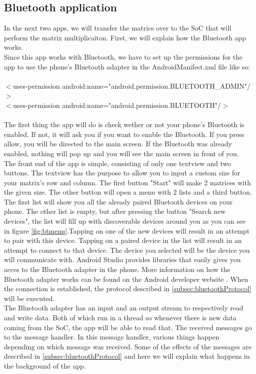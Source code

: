\documentclass[a4paper, 11pt]{report}
\begin{document}
	\subsection{Bluetooth application}
In the next two apps, we will transfer the matrics over to the SoC that will perform the matrix multiplicaiton. First, we will explain how the Bluetooth app works.\\
Since this app works with Bluetooth, we have to set up the permissions for the app to use the phone's Bluetooth adapter in the AndroidManifest.xml file like so:\\\\
\indent	$<$uses-permission android:name="android.permission.BLUETOOTH\_ADMIN"/$>$\\
\indent $<$uses-permission android:name="android.permission.BLUETOOTH"/$>$
\\\\
The first thing the app will do is check wether or not your phone's Bluetooth is enabled. If not, it will ask you if you want to enable the Bluetooth. If you press allow, you will be directed to the main screen. If the Bluetooth was already enabled, nothing will pop up and you will see the main screen in front of you. The front end of the app is simple, consisting of only one textview and two buttons. The textview has the purpose to allow you to input a custom size for your matrix's row and column. The first button "Start" will make 2 matrices with the given size. The other button will open a menu with 2 lists and a third button. The first list will show you all the already paired Bluetooth devices on your phone. The other list is empty, but after pressing the button "Search new devices", the list will fill up with discoverable devices around you as you can see in figure \ref{fig:btmenu}.Tapping on one of the new devices will result in an attempt to pair with this device. Tapping on a paired device in the list will result in an attempt to connect to that device. The device you selected will be the device you will communicate with. Android Studio provides libraries that easily gives you acces to the Bluetooth adapter in the phone. More information on how the Bluetooth adapter works can be found on the Android developer website \cite{AndroidDeveloper}. When the connection is established, the protocol described in \ref{subsec:bluetoothProtocol} will be executed.\\
The Bluetooth adapter has an input and an output stream to respectively read and write data. 
Both of which run in a thread so whenever there is new data coming from the SoC, the app will be able to read that. The received messages go to the message handler. In this message handler, various things happen depending on which message was received. Some of the effects of the messages are described in \ref{subsec:bluetoothProtocol} and here we will explain what happens in the background of the app.\\
\end{document}
